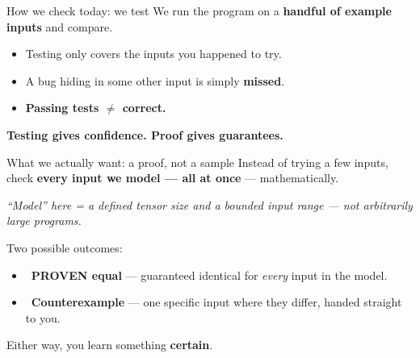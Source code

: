 \documentclass[aspectratio=169,11pt]{beamer}
\newcommand{\good}{\textcolor{ok}{\ding{51}}}
\newcommand{\bad}{\textcolor{warn}{\ding{55}}}
\begin{document}
\begin{frame}{How we check today: we test}
  We run the program on a \textbf{handful of example inputs} and compare.

  \bigskip

  \bigskip
  \begin{itemize}
    \item Testing only covers the inputs you happened to try.
    \item A bug hiding in some other input is simply \textbf{missed}.
    \item \textcolor{warn}{\textbf{Passing tests $\neq$ correct.}}
  \end{itemize}

  \bigskip
  \begin{block}{}
    \centering \textbf{Testing gives confidence. Proof gives guarantees.}
  \end{block}
\end{frame}

\begin{frame}{What we actually want: a proof, not a sample}
  Instead of trying a few inputs, check \textbf{every input we model --- all at once} --- mathematically.

  \smallskip
  {\small\itshape ``Model'' here = a defined tensor size and a bounded input range --- not arbitrarily large programs.}

  \bigskip
  Two possible outcomes:
  \begin{itemize}
    \item \good\ \textbf{PROVEN equal} --- guaranteed identical for \emph{every} input in the model.
    \item \bad\ \textbf{Counterexample} --- one specific input where they differ, handed straight to you.
  \end{itemize}

  \bigskip
  Either way, you learn something \textbf{certain}.
\end{frame}
\end{document}
